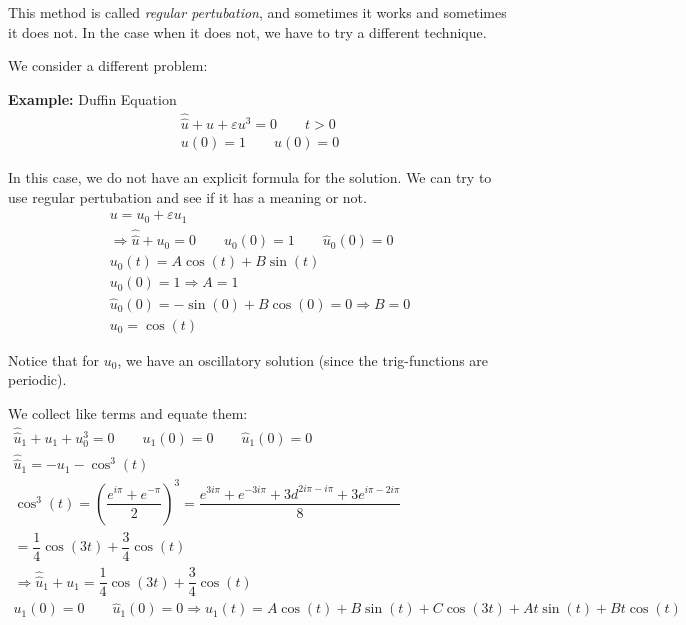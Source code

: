 \par\bigskip
\noindent This method is called \textit{regular pertubation}, and sometimes it works and sometimes it does not. In the case when it does not, we have to try a different technique.\par
\noindent We consider a different problem:
\par\bigskip
\noindent\textbf{Example:} Duffin Equation
\begin{equation*}
  \begin{gathered}
    \hat{\hat{u}} + u+\varepsilon u^3 = 0\qquad t>0\\
    u(0) = 1\qquad \hat{u}(0) = 0
  \end{gathered}
\end{equation*}\par
\noindent In this case, we do not have an explicit formula for the solution. We can try to use regular pertubation and see if it has a meaning or not.
\begin{equation*}
  \begin{gathered}
    u = u_0+\varepsilon u_1\\
    \Rightarrow \hat{\hat{u}} + u_0 = 0\qquad u_0(0) = 1 \qquad \hat{u}_0(0)=0\\
    u_0(t) = A\cos(t)+B\sin(t)\\
    u_0(0) = 1\Rightarrow A = 1\\
    \hat{u}_0(0)= -\sin(0)+B\cos(0)=0\Rightarrow B = 0\\
    u_0 = \cos(t)
  \end{gathered}
\end{equation*}\par
\noindent Notice that for $u_0$, we have an oscillatory solution (since the trig-functions are periodic).
\par\bigskip
\noindent We collect like terms and equate them:
\begin{equation*}
  \begin{gathered}
    \hat{\hat{u}}_1+u_1+u^3_0=0\qquad u_1(0) = 0 \qquad\hat{u}_1(0) = 0\\
    \hat{\hat{u}}_1 = -u_1-\cos^3(t)\\
    \cos^3(t) = \left(\dfrac{e^{i\pi}+e^{-\pi}}{2}\right)^3 =  \dfrac{e^{3i\pi}+e^{-3i\pi}+3d^{2i\pi-i\pi}+3e^{i\pi-2i\pi}}{8}\\
    =\dfrac{1}{4}\cos(3t)+\dfrac{3}{4}\cos(t)\\
    \Rightarrow \hat{\hat{u}}_1+u_1 = \dfrac{1}{4}\cos(3t)+\dfrac{3}{4}\cos(t)\\
    u_1(0)=0 \qquad\hat{u}_1(0)=0\Rightarrow u_1(t) = A\cos(t)+B\sin(t)+C\cos(3t)+At\sin(t)+Bt\cos(t)
  \end{gathered}
\end{equation*}\par
